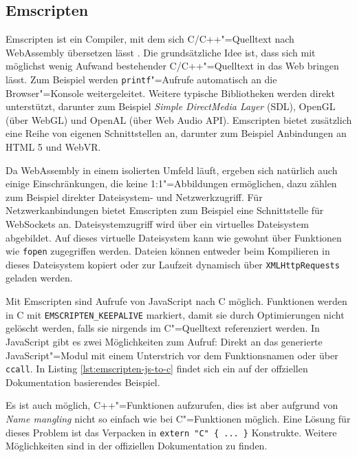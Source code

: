 \subsection{Emscripten}

Emscripten ist ein Compiler, mit dem sich C/C++"=Quelltext nach WebAssembly übersetzen lässt \cite{Emscripten}. Die grundsätzliche Idee ist, dass sich mit möglichst wenig Aufwand bestehender C/C++"=Quelltext in das Web bringen lässt. Zum Beispiel werden \lstinline{printf}"=Aufrufe automatisch an die Browser"=Konsole weitergeleitet. Weitere typische Bibliotheken werden direkt unterstützt, darunter zum Beispiel \emph{Simple DirectMedia Layer} (SDL), OpenGL (über WebGL) und OpenAL (über Web Audio API). Emscripten bietet zusätzlich eine Reihe von eigenen Schnittstellen an, darunter zum Beispiel Anbindungen an HTML 5 und WebVR.

Da WebAssembly in einem isolierten Umfeld läuft, ergeben sich natürlich auch einige Einschränkungen, die keine 1:1"=Abbildungen ermöglichen, dazu zählen zum Beispiel direkter Dateisystem- und Netzwerkzugriff. Für Netzwerkanbindungen bietet Emscripten zum Beispiel eine Schnittstelle für WebSockets an. Dateisystemzugriff wird über ein virtuelles Dateisystem abgebildet. Auf dieses virtuelle Dateisystem kann wie gewohnt über Funktionen wie \lstinline{fopen} zugegriffen werden. Dateien können entweder beim Kompilieren in dieses Dateisystem kopiert oder zur Laufzeit dynamisch über \lstinline{XMLHttpRequests} geladen werden.

Mit Emscripten sind Aufrufe von JavaScript nach C möglich. Funktionen werden in C mit \lstinline{EMSCRIPTEN_KEEPALIVE} markiert, damit sie durch Optimierungen nicht gelöscht werden, falls sie nirgends im C"=Quelltext referenziert werden. In JavaScript gibt es zwei Möglichkeiten zum Aufruf: Direkt an das generierte JavaScript"=Modul mit einem Unterstrich vor dem Funktionsnamen oder über \lstinline{ccall}. In Listing \ref{lst:emscripten-js-to-c} findet sich ein auf der offziellen Dokumentation basierendes Beispiel.



Es ist auch möglich, C++"=Funktionen aufzurufen, dies ist aber aufgrund von \emph{Name mangling} nicht so einfach wie bei C"=Funktionen möglich. Eine Lösung für dieses Problem ist das Verpacken in \lstinline|extern "C" { ... }| Konstrukte. Weitere Möglichkeiten sind in der offiziellen Dokumentation zu finden.

